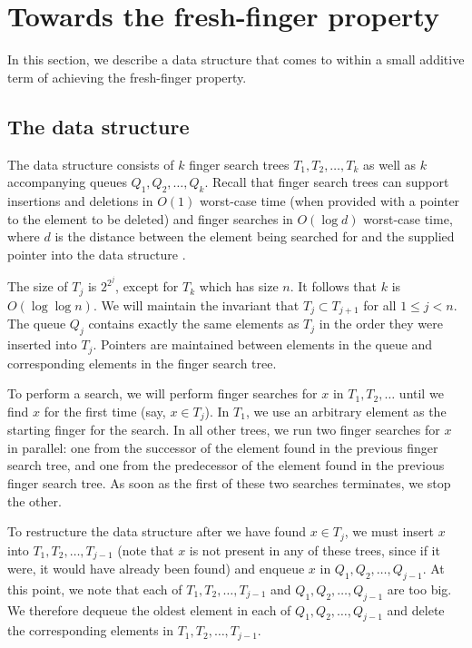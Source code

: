 \documentclass{llncs}
\newcommand{\BigOh}[1]{O\!\left(#1\right)}
\begin{document}
\section{Towards the fresh-finger property}
\label{section:main}

In this section, we describe a data structure that comes to within a small additive term of achieving the fresh-finger property.

\subsection{The data structure}
\label{section:main:datastructure}

The data structure consists of $k$ finger search trees $T_1,T_2,\ldots,T_k$ as well as $k$ accompanying queues $Q_1,Q_2,\ldots,Q_k$. Recall that finger search trees can support insertions and deletions in $\BigOh{1}$ worst-case time (when provided with a pointer to the element to be deleted) and finger searches in $\BigOh{\log d}$ worst-case time, where $d$ is the distance between the element being searched for and the supplied pointer into the data structure \cite{DBLP:journals/jcss/BrodalLMTT03}. 

The size of $T_j$ is $2^{2^j}$, except for $T_k$ which has size $n$. It follows that $k$ is $\BigOh{\log \log n}$. We will maintain the invariant that $T_j \subset T_{j+1}$ for all $1 \le j < n$. The queue $Q_j$ contains exactly the same elements as $T_j$ in the order they were inserted into $T_j$. Pointers are maintained between elements in the queue and corresponding elements in the finger search tree.

To perform a search, we will perform finger searches for $x$ in $T_1,T_2,\ldots$ until we find $x$ for the first time (say, $x \in T_j$). In $T_1$, we use an arbitrary element as the starting finger for the search. In all other trees, we run two finger searches for $x$ in parallel: one from the successor of the element found in the previous finger search tree, and one from the predecessor of the element found in the previous finger search tree. As soon as the first of these two searches terminates, we stop the other. 

To restructure the data structure after we have found $x \in T_j$, we must insert $x$ into $T_1,T_2,\ldots,T_{j-1}$ (note that $x$ is not present in any of these trees, since if it were, it would have already been found) and enqueue $x$ in $Q_1,Q_2,\ldots,Q_{j-1}$. At this point, we note that each of $T_1,T_2,\ldots,T_{j-1}$ and $Q_1,Q_2,\ldots,Q_{j-1}$ are too big. We therefore dequeue the oldest element in each of $Q_1,Q_2,\ldots,Q_{j-1}$ and delete the corresponding elements in $T_1,T_2,\ldots,T_{j-1}$.
\end{document}
